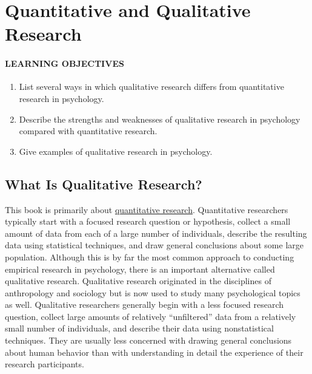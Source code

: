 \documentclass[
]{krantz}
\providecommand{\tightlist}{%
  \setlength{\itemsep}{0pt}\setlength{\parskip}{0pt}}
\begin{document}
\section{Quantitative and Qualitative Research}\label{quantitative-and-qualitative-research}

\paragraph*{LEARNING OBJECTIVES}\label{learning-objectives-5}

\begin{enumerate}
\def\labelenumi{\arabic{enumi}.}
\tightlist
\item
  List several ways in which qualitative research differs from quantitative research in psychology.
\item
  Describe the strengths and weaknesses of qualitative research in psychology compared with quantitative research.
\item
  Give examples of qualitative research in psychology.
\end{enumerate}

\subsection*{What Is Qualitative Research?}\label{what-is-qualitative-research}


This book is primarily about \hyperref[quantitative-research]{quantitative research}. Quantitative researchers typically start with a focused research question or hypothesis, collect a small amount of data from each of a large number of individuals, describe the resulting data using statistical techniques, and draw general conclusions about some large population. Although this is by far the most common approach to conducting empirical research in psychology, there is an important alternative called qualitative research. Qualitative research originated in the disciplines of anthropology and sociology but is now used to study many psychological topics as well. Qualitative researchers generally begin with a less focused research question, collect large amounts of relatively ``unfiltered'' data from a relatively small number of individuals, and describe their data using nonstatistical techniques. They are usually less concerned with drawing general conclusions about human behavior than with understanding in detail the experience of their research participants.
\end{document}
